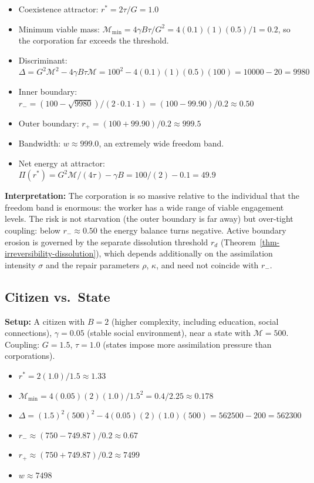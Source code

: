 \documentclass[11pt]{article}
\theoremstyle{plain}
\theoremstyle{definition}
\theoremstyle{remark}
\let\origsubsection\subsection
\renewcommand{\subsection}{\needspace{7\baselineskip}\origsubsection}
\providecommand{\tightlist}{%
  \setlength{\itemsep}{0pt}\setlength{\parskip}{0pt}}
\begin{document}
\begin{itemize}
\tightlist
\item
  Coexistence attractor: \(r^* = 2\tau/G = 1.0\)
\item
  Minimum viable mass:
  \(\mathcal{M}_{\min} = 4\gamma B \tau / G^2 = 4(0.1)(1)(0.5)/1 = 0.2\),
  so the corporation far exceeds the threshold.
\item
  Discriminant:
  \(\Delta = G^2\mathcal{M}^2 - 4\gamma B \tau \mathcal{M} = 100^2 - 4(0.1)(1)(0.5)(100) = 10000 - 20 = 9980\)
\item
  Inner boundary:
  \(r_- = (100 - \sqrt{9980})/(2 \cdot 0.1 \cdot 1) = (100 - 99.90)/0.2 \approx 0.50\)
\item
  Outer boundary: \(r_+ = (100 + 99.90)/0.2 \approx 999.5\)
\item
  Bandwidth: \(w \approx 999.0\), an extremely wide freedom band.
\item
  Net energy at attractor:
  \(\Pi(r^*) = G^2\mathcal{M}/(4\tau) - \gamma B = 100/(2) - 0.1 = 49.9\)
\end{itemize}

\textbf{Interpretation:} The corporation is so massive relative to the
individual that the freedom band is enormous: the worker has a wide
range of viable engagement levels. The risk is not starvation (the outer
boundary is far away) but over-tight coupling: below
\(r_- \approx 0.50\) the energy balance turns negative. Active boundary
erosion is governed by the separate dissolution threshold \(r_d\)
(Theorem~\ref{thm-irreversibility-dissolution}), which depends
additionally on the assimilation intensity \(\sigma\) and the repair
parameters \(\rho\), \(\kappa\), and need not coincide with \(r_-\).

\subsection{Citizen vs.~State}\label{citizen-vs.-state}

\textbf{Setup:} A citizen with \(B = 2\) (higher complexity, including
education, social connections), \(\gamma = 0.05\) (stable social
environment), near a state with \(\mathcal{M} = 500\). Coupling:
\(G = 1.5\), \(\tau = 1.0\) (states impose more assimilation pressure
than corporations).

\begin{itemize}
\tightlist
\item
  \(r^* = 2(1.0)/1.5 \approx 1.33\)
\item
  \(\mathcal{M}_{\min} = 4(0.05)(2)(1.0)/1.5^2 = 0.4/2.25 \approx 0.178\)
\item
  \(\Delta = (1.5)^2(500)^2 - 4(0.05)(2)(1.0)(500) = 562500 - 200 = 562300\)
\item
  \(r_- \approx (750 - 749.87)/0.2 \approx 0.67\)
\item
  \(r_+ \approx (750 + 749.87)/0.2 \approx 7499\)
\item
  \(w \approx 7498\)
\end{itemize}
\end{document}
